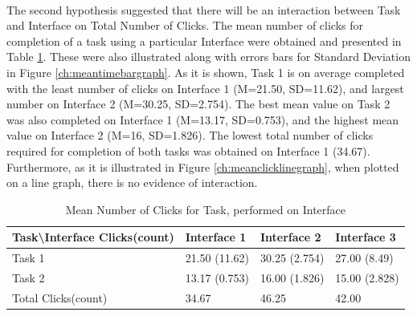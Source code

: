 \documentclass{l4proj}
\begin{document}
\paragraph{}
The second hypothesis suggested that there will be an interaction between Task and Interface on Total Number of Clicks. The mean number of clicks for completion of a task using a particular Interface were obtained and presented in Table \ref{tab:clickspertaskandinterface}. These were also illustrated along with errors bars for Standard Deviation in Figure \ref{ch:meantimebargraph}. As it is shown, Task 1 is on average completed with the least number of clicks on Interface 1 (M=21.50, SD=11.62), and largest number on Interface 2 (M=30.25, SD=2.754). The best mean value on Task 2 was also completed on Interface 1 (M=13.17, SD=0.753), and the highest mean value on Interface 2 (M=16, SD=1.826). The lowest total number of clicks required for completion of both tasks was obtained on Interface 1 (34.67). Furthermore, as it is illustrated in Figure \ref{ch:meanclicklinegraph}, when plotted on a line graph, there is no evidence of interaction. 


\begin{table}[H]
	\centering
	\begin{tabular}{|l|l|l|l|} \hline
		Task\textbackslash Interface Clicks(count)&	Interface 1	& Interface 2 &	Interface 3 \\ \hline
		Task 1 	& 21.50 (11.62)	& 30.25 (2.754)	& 27.00 (8.49)  \\ \hline
		Task 2	& 13.17 (0.753)	& 16.00 (1.826)	& 15.00 (2.828)  \\ \hline
		Total Clicks(count)	& 34.67	& 46.25 & 42.00 \\ \hline
	\end{tabular}
	\caption{Mean Number of Clicks for Task, performed on Interface}
	\label{tab:clickspertaskandinterface}
\end{table}
\end{document}
